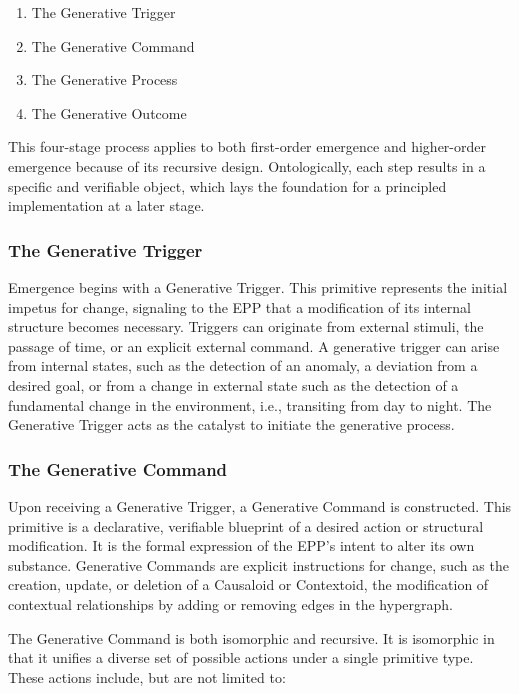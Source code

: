 \begin{enumerate}
	\item The Generative Trigger
	\item The Generative Command
	\item The Generative Process
	\item The Generative Outcome 
\end{enumerate}

This four-stage process applies to both first-order emergence and higher-order emergence because of its recursive design. Ontologically, each step results in a specific and verifiable object, which lays the foundation for a principled implementation at a later stage. 


\subsubsection{The Generative Trigger}
\label{sec:ontology_emgerence_gen_trigger}

Emergence begins with a Generative Trigger. This primitive represents the initial impetus for change, signaling to the EPP that a modification of its internal structure becomes necessary. Triggers can originate from external stimuli, the passage of time, or an explicit external command. A generative trigger can arise from internal states, such as the detection of an anomaly, a deviation from a desired goal, or from a change in external state such as the detection of a fundamental change in the environment, i.e., transiting from day to night. The Generative Trigger acts as the catalyst to initiate the generative process.


\subsubsection{The Generative Command}
\label{sec:ontology_emgerence_gen_command}

Upon receiving a Generative Trigger, a Generative Command is constructed. This primitive is a declarative, verifiable blueprint of a desired action or structural modification. It is the formal expression of the EPP's intent to alter its own substance. Generative Commands are explicit instructions for change, such as the creation, update, or deletion of a Causaloid or Contextoid, the modification of contextual relationships by adding or removing edges in the hypergraph. 

The Generative Command is both isomorphic and recursive. It is isomorphic in that it unifies a diverse set of possible actions under a single primitive type. These actions include, but are not limited to:


